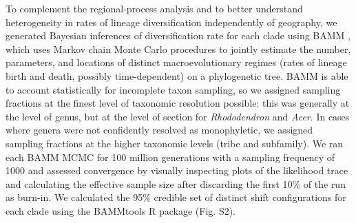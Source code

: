 To complement the regional-process analysis and to better understand heterogeneity in rates of lineage diversification independently of geography, we generated Bayesian inferences of diversification rate for each clade using BAMM \cite{Rabosky2014}, which uses Markov chain Monte Carlo procedures to jointly estimate the number, parameters, and locations of distinct macroevolutionary regimes (rates of lineage birth and death, possibly time-dependent) on a phylogenetic tree. BAMM is able to account statistically for incomplete taxon sampling, so we assigned sampling fractions at the finest level of taxonomic resolution possible: this was generally at the level of genus, but at the level of section for \textit{Rhododendron} and \textit{Acer}. In cases where genera were not confidently resolved as monophyletic, we assigned sampling fractions at the higher taxonomic levels (tribe and subfamily). We ran each BAMM MCMC for 100 million generations with a sampling frequency of 1000 and assessed convergence by visually inspecting plots of the likelihood trace and calculating the effective sample size after discarding the first 10\% of the run as burn-in. We calculated the 95\% credible set of distinct shift configurations for each clade using the BAMMtools R package \cite{Rabosky2014} (Fig. S2).